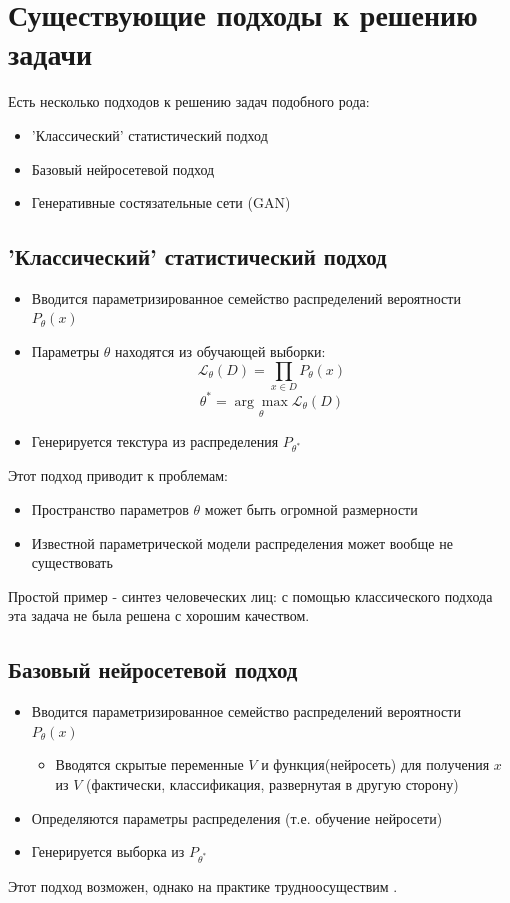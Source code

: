 \documentclass[a4paper]{article}
\begin{document}
	\section{Существующие подходы к решению задачи}
		Есть несколько подходов к решению задач подобного рода:
		\begin{itemize}
			\item 'Классический' статистический подход
			\item Базовый нейросетевой подход
			\item Генеративные состязательные сети (GAN)
		\end{itemize}
		\subsection{'Классический' статистический подход}
			\begin{itemize}
				\item Вводится параметризированное семейство распределений вероятности $P_{\theta}(x)$
				\item Параметры $\theta$ находятся из обучающей выборки:
				$$ \mathcal{L}_{\theta}(D) = \prod_{x \in D} P_{\theta}(x) $$
				$$ \theta^{*} = \underset{\theta}{\arg\max} \mathcal{L}_{\theta}(D)$$
				\item Генерируется текстура из распределения $ P_{\theta^{*}}$
			\end{itemize}
			Этот подход приводит к проблемам:
			\begin{itemize}
				\item Пространство параметров $\theta$ может быть огромной размерности
				\item Известной параметрической модели распределения может вообще не существовать
			\end{itemize}
			Простой пример - синтез человеческих лиц: с помощью классического подхода эта задача не была решена с хорошим качеством.
		\subsection{Базовый нейросетевой подход}
			\begin{itemize}
				\item Вводится параметризированное семейство распределений вероятности $P_{\theta}(x)$
				\begin{itemize}
					\item Вводятся скрытые переменные $V$ и функция(нейросеть) для получения $x$ из $V$ (фактически, классификация, развернутая в другую сторону)
				\end{itemize}
				\item Определяются параметры распределения (т.е. обучение нейросети)
				\item Генерируется выборка из $ P_{\theta^{*}}$
			\end{itemize}
			Этот подход возможен, однако на практике трудноосуществим \cite{GAN-2}.
\end{document}
